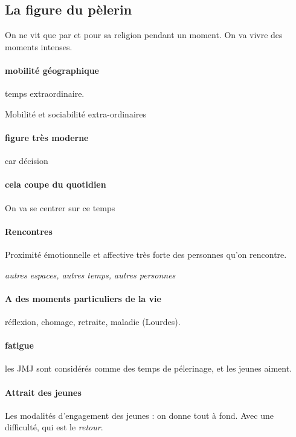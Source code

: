 \subsection{La figure du pèlerin}

\begin{Def}[pélerinage]
    On ne vit que par et pour sa religion pendant un moment. On va vivre des moments intenses.
\end{Def}

\paragraph{mobilité géographique} temps extraordinaire. 

Mobilité et sociabilité extra-ordinaires

\paragraph{figure très moderne} car décision

\paragraph{cela coupe du quotidien} On va se centrer sur ce temps

\paragraph{Rencontres} Proximité émotionnelle et affective très forte des personnes qu'on rencontre. 

\textit{autres espaces, autres temps, autres personnes}

\paragraph{A des moments particuliers de la vie} réflexion, chomage, retraite, maladie (Lourdes).

\paragraph{fatigue} les JMJ sont considérés comme des temps de pélerinage, et les jeunes aiment. 


\paragraph{Attrait des jeunes} Les modalités d'engagement des jeunes : on donne tout à fond. Avec une difficulté, qui est le \textit{retour}.


